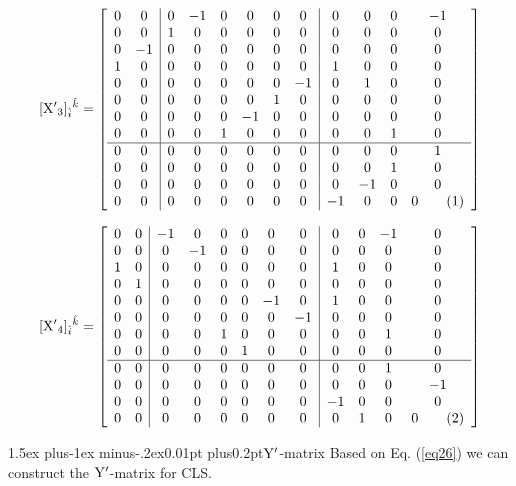 \documentclass[12pt]{article}
\makeatletter
\newcommand\numberthis{\addtocounter{equation}{1}\tag{\theequation}}
\let\bm\relax
\newcommand{\bm}[1]{{\boldsymbol{#1}}}
\def\subsubsection{\@startsection{subsubsection}{3}{\z@}
          {1.5ex plus-1ex minus-.2ex}{0.01pt plus0.2pt}{\sf\boldmath}}
\makeatother
\begin{document}
\[[{\bm{\rm X'}_3}]_{\hat i}{}^{\hat k}= 
\left[\begin{array}{cc|cccccc|cccc}
 0 & 0 & 0 & -1 & 0 & 0 & 0 & 0 & 0 & 0 & 0 & -1 \\
 0 & 0 & 1 & 0 & 0 & 0 & 0 & 0 & 0 & 0 & 0 & 0 \\
 0 & -1 & 0 & 0 & 0 & 0 & 0 & 0 & 0 & 0 & 0 & 0 \\
 1 & 0 & 0 & 0 & 0 & 0 & 0 & 0 & 1 & 0 & 0 & 0 \\
 0 & 0 & 0 & 0 & 0 & 0 & 0 & -1 & 0 & 1 & 0 & 0 \\
 0 & 0 & 0 & 0 & 0 & 0 & 1 & 0 & 0 & 0 & 0 & 0 \\
 0 & 0 & 0 & 0 & 0 & -1 & 0 & 0 & 0 & 0 & 0 & 0 \\
 0 & 0 & 0 & 0 & 1 & 0 & 0 & 0 & 0 & 0 & 1 & 0 \\
 \hline
 0 & 0 & 0 & 0 & 0 & 0 & 0 & 0 & 0 & 0 & 0 & 1 \\
 0 & 0 & 0 & 0 & 0 & 0 & 0 & 0 & 0 & 0 & 1 & 0 \\
 0 & 0 & 0 & 0 & 0 & 0 & 0 & 0 & 0 & -1 & 0 & 0 \\
 0 & 0 & 0 & 0 & 0 & 0 & 0 & 0 & -1 & 0 & 0 & 0 
\numberthis\end{array}\right] \]

\[[{\bm{\rm X'}_4}]_{\hat i}{}^{\hat k}= 
\left[\begin{array}{cc|cccccc|cccc}
 0 & 0 & -1 & 0 & 0 & 0 & 0 & 0 & 0 & 0 & -1 & 0 \\
 0 & 0 & 0 & -1 & 0 & 0 & 0 & 0 & 0 & 0 & 0 & 0 \\
 1 & 0 & 0 & 0 & 0 & 0 & 0 & 0 & 1 & 0 & 0 & 0 \\
 0 & 1 & 0 & 0 & 0 & 0 & 0 & 0 & 0 & 0 & 0 & 0 \\
 0 & 0 & 0 & 0 & 0 & 0 & -1 & 0 & 1 & 0 & 0 & 0 \\
 0 & 0 & 0 & 0 & 0 & 0 & 0 & -1 & 0 & 0 & 0 & 0 \\
 0 & 0 & 0 & 0 & 1 & 0 & 0 & 0 & 0 & 0 & 1 & 0 \\
 0 & 0 & 0 & 0 & 0 & 1 & 0 & 0 & 0 & 0 & 0 & 0 \\
 \hline
 0 & 0 & 0 & 0 & 0 & 0 & 0 & 0 & 0 & 0 & 1 & 0 \\
 0 & 0 & 0 & 0 & 0 & 0 & 0 & 0 & 0 & 0 & 0 & -1 \\
 0 & 0 & 0 & 0 & 0 & 0 & 0 & 0 & -1 & 0 & 0 & 0 \\
 0 & 0 & 0 & 0 & 0 & 0 & 0 & 0 & 0 & 1 & 0 & 0 
\numberthis\end{array}\right] \]

\subsubsection{$\bm{\rm Y'}$-matrix}
Based on Eq. (\ref{eq26}) we can construct the $\bm{\rm{Y'}}$-matrix for CLS.
\end{document}
